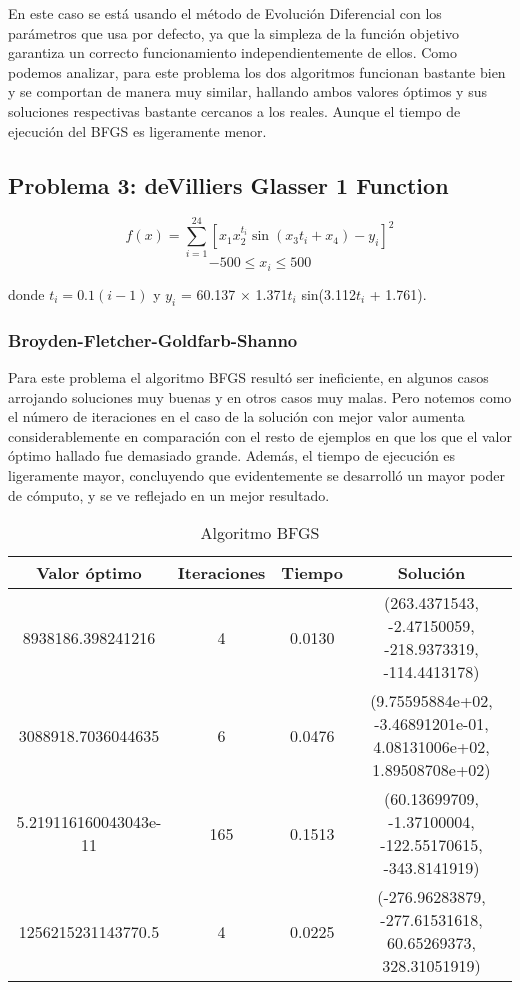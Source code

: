 \documentclass{article}
\begin{document}
En este caso se está usando el método de Evolución Diferencial con
los parámetros que usa por defecto, ya que la simpleza de la función
objetivo garantiza un correcto funcionamiento independientemente de ellos.
Como podemos analizar,
para este problema los dos algoritmos funcionan bastante bien y se
comportan de manera muy similar, hallando ambos valores óptimos y sus
soluciones respectivas bastante cercanos a los reales. Aunque el tiempo
de ejecución del BFGS es ligeramente menor.


\subsection{Problema 3: deVilliers Glasser 1 Function}

$$
	f(x) = \sum_{i=1}^{24} \left[ x_{1}x_{2}^{t_{i}}\sin(x_{3}t_{i} + x_{4}) - y_{i} \right]^2
$$
$$
	-500 \leq x_i \leq 500
$$

donde $t_i = 0.1(i - 1)$ y $y_i$ = 60.137 $\times$ 1.371$t_i$ sin(3.112$t_i$ + 1.761).

\subsubsection{Broyden-Fletcher-Goldfarb-Shanno}

Para este problema el algoritmo BFGS resultó ser ineficiente, en algunos 
casos arrojando soluciones muy buenas y en otros casos muy malas. Pero notemos
como el número de iteraciones en el caso de la solución con mejor valor
aumenta considerablemente en comparación con el resto de ejemplos en que los 
que el valor óptimo hallado fue demasiado grande. Además, el tiempo de ejecución
es ligeramente mayor, concluyendo que evidentemente se desarrolló un mayor 
poder de cómputo, y se ve reflejado en un mejor resultado.

\begin{table}[ht]
	\begin{center}
		\begin{tabular}{|c|c|c|c|}
			\hline
			\textbf{Valor óptimo} & \textbf{Iteraciones} & \textbf{Tiempo} & \textbf{Solución}                                                 \\
			\hline
			8938186.398241216     & 4                    & 0.0130          & (263.4371543, -2.47150059, -218.9373319, -114.4413178)            \\
			3088918.7036044635    & 6                    & 0.0476          & (9.75595884e+02, -3.46891201e-01, 4.08131006e+02, 1.89508708e+02) \\
			5.219116160043043e-11 & 165                  & 0.1513          & (60.13699709, -1.37100004, -122.55170615, -343.8141919)           \\
			1256215231143770.5    & 4                    & 0.0225          & (-276.96283879, -277.61531618, 60.65269373, 328.31051919)         \\
			\hline
		\end{tabular}
		\caption{Algoritmo BFGS}

	\end{center}
\end{table}
\end{document}
